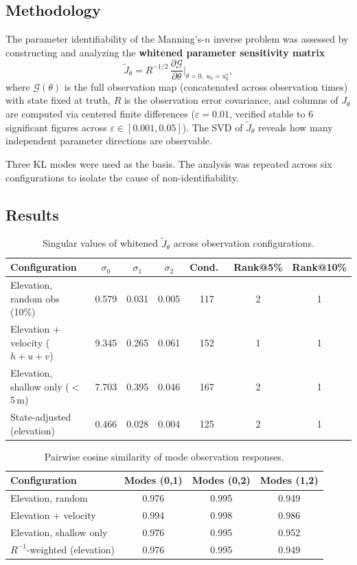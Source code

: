 \documentclass[11pt]{article}
\begin{document}
\subsection{Methodology}
The parameter identifiability of the Manning's-$n$ inverse problem was assessed by constructing and analyzing the \textbf{whitened parameter sensitivity matrix}
\[
\widetilde{J}_\theta = R^{-1/2}\,\frac{\partial \mathcal{G}}{\partial \theta}\bigg|_{\theta=0,\; u_0=u_0^{\star}},
\]
where $\mathcal{G}(\theta)$ is the full observation map (concatenated across observation times) with state fixed at truth, $R$ is the observation error covariance, and columns of $J_\theta$ are computed via centered finite differences ($\varepsilon = 0.01$, verified stable to 6 significant figures across $\varepsilon \in [0.001, 0.05]$). The SVD of $\widetilde{J}_\theta$ reveals how many independent parameter directions are observable.

Three KL modes were used as the basis. The analysis was repeated across six configurations to isolate the cause of non-identifiability.

\subsection{Results}
\begin{table}[h]
\centering
\caption{Singular values of whitened $\widetilde{J}_\theta$ across observation configurations.}
\label{tab:identifiability}
\begin{tabular}{lcccccc}
\toprule
Configuration & $\sigma_0$ & $\sigma_1$ & $\sigma_2$ & Cond.\ & Rank@5\% & Rank@10\% \\
\midrule
Elevation, random obs (10\%) & 0.579 & 0.031 & 0.005 & 117 & 2 & 1 \\
Elevation $+$ velocity ($h{+}u{+}v$) & 9.345 & 0.265 & 0.061 & 152 & 1 & 1 \\
Elevation, shallow only ($<$5\,m) & 7.703 & 0.395 & 0.046 & 167 & 2 & 1 \\
State-adjusted (elevation) & 0.466 & 0.028 & 0.004 & 125 & 2 & 1 \\
\bottomrule
\end{tabular}
\end{table}

\begin{table}[h]
\centering
\caption{Pairwise cosine similarity of mode observation responses.}
\label{tab:collinearity}
\begin{tabular}{lccc}
\toprule
Configuration & Modes (0,1) & Modes (0,2) & Modes (1,2) \\
\midrule
Elevation, random & 0.976 & 0.995 & 0.949 \\
Elevation $+$ velocity & 0.994 & 0.998 & 0.986 \\
Elevation, shallow only & 0.976 & 0.995 & 0.952 \\
$R^{-1}$-weighted (elevation) & 0.976 & 0.995 & 0.949 \\
\bottomrule
\end{tabular}
\end{table}
\end{document}
